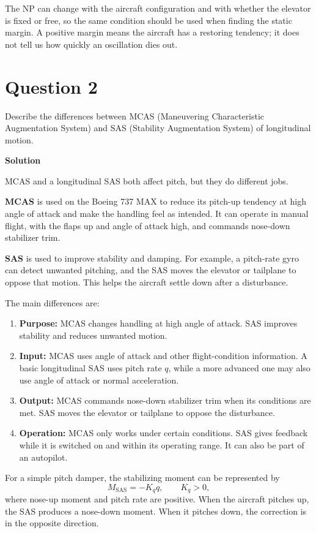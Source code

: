 \documentclass[12pt,a4paper]{article}
\begin{document}
The NP can change with the aircraft configuration and with whether the elevator is fixed or free, so the same condition should be used when finding the static margin. A positive margin means the aircraft has a restoring tendency; it does not tell us how quickly an oscillation dies out.

\newpage
\section*{Question 2}
Describe the differences between MCAS (Maneuvering Characteristic Augmentation System) and SAS (Stability Augmentation System) of longitudinal motion.

\textbf{Solution}

MCAS and a longitudinal SAS both affect pitch, but they do different jobs.

\textbf{MCAS} is used on the Boeing 737 MAX to reduce its pitch-up tendency at high angle of attack and make the handling feel as intended. It can operate in manual flight, with the flaps up and angle of attack high, and commands nose-down stabilizer trim.

\textbf{SAS} is used to improve stability and damping. For example, a pitch-rate gyro can detect unwanted pitching, and the SAS moves the elevator or tailplane to oppose that motion. This helps the aircraft settle down after a disturbance.

The main differences are:
\begin{enumerate}
\item \textbf{Purpose:} MCAS changes handling at high angle of attack. SAS improves stability and reduces unwanted motion.
\item \textbf{Input:} MCAS uses angle of attack and other flight-condition information. A basic longitudinal SAS uses pitch rate $q$, while a more advanced one may also use angle of attack or normal acceleration.
\item \textbf{Output:} MCAS commands nose-down stabilizer trim when its conditions are met. SAS moves the elevator or tailplane to oppose the disturbance.
\item \textbf{Operation:} MCAS only works under certain conditions. SAS gives feedback while it is switched on and within its operating range. It can also be part of an autopilot.
\end{enumerate}
For a simple pitch damper, the stabilizing moment can be represented by
\[
M_{\mathrm{SAS}}=-K_q q,\qquad K_q>0,
\]
where nose-up moment and pitch rate are positive. When the aircraft pitches up, the SAS produces a nose-down moment. When it pitches down, the correction is in the opposite direction.
\end{document}
